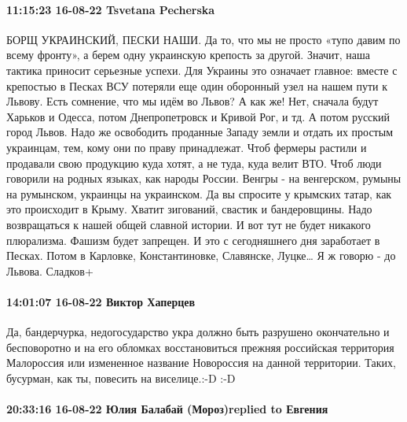  
 
 
 
 

\paragraph{11:15:23 16-08-22 Tsvetana Pecherska}

\obeycr
БОРЩ УКРАИНСКИЙ, ПЕСКИ НАШИ.
Да то, что мы не просто «тупо давим по всему фронту», а берем одну украинскую крепость за другой. Значит, наша тактика приносит серьезные успехи.
Для Украины это означает главное: вместе с крепостью в Песках ВСУ потеряли еще один оборонный узел на нашем пути к Львову.
Есть сомнение, что мы идём во Львов? А как же!
Нет, сначала будут Харьков и Одесса, потом Днепропетровск и Кривой Рог, и тд. А потом русский город Львов.
Надо же освободить проданные Западу земли и отдать их простым украинцам, тем, кому они по праву принадлежат. Чтоб фермеры растили и продавали свою продукцию куда хотят, а не туда, куда велит ВТО.
Чтоб люди говорили на родных языках, как народы России. Венгры - на венгерском, румыны на румынском, украинцы на украинском. Да вы спросите у крымских татар, как это происходит в Крыму.
Хватит зигований, свастик и бандеровщины. Надо возвращаться к нашей общей славной истории. И вот тут не будет никакого плюрализма. Фашизм будет запрещен.
И это с сегодняшнего дня заработает в Песках. Потом в Карловке, Константиновке, Славянске, Луцке… Я ж говорю - до Львова.
Сладков+
\restorecr

\paragraph{14:01:07 16-08-22 Виктор Хаперцев}

\obeycr
Да, бандерчурка, недогосударство укра должно быть разрушено окончательно и бесповоротно и на его обломках восстановиться прежняя российская территория Малороссия или измененное название Новороссия на данной территории.
Таких, бусурман, как ты, повесить на виселице.:-D :-D
\restorecr


\paragraph{20:33:16 16-08-22 Юлия Балабай (Мороз)replied to Евгения}

